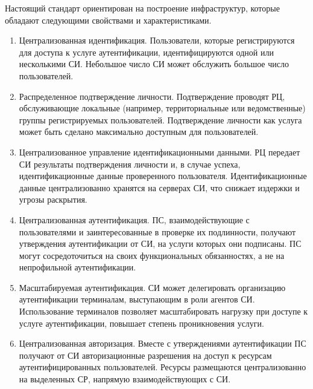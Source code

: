 Настоящий стандарт ориентирован на построение инфраструктур, которые обладают
следующими свойствами и характеристиками.

\begin{enumerate}
\item
Централизованная идентификация.
%
Пользователи, которые регистрируются для доступа к услуге аутентификации, 
идентифицируются одной или несколькими СИ. 
%
Небольшое число СИ может обслужить большое число пользователей.

\item
Распределенное подтверждение личности.
%
Подтверждение проводят РЦ, обслуживающие локальные (например, 
территориальные или ведомственные) группы регистрируемых пользователей. 
%
Подтверждение личности как услуга может быть сделано максимально доступным для 
пользователей.

\item
Централизованное управление идентификационными данными.
%
РЦ передает СИ результаты подтверждения личности и, в случае успеха, 
идентификационные данные проверенного пользователя.
%
Идентификационные данные централизованно хранятся на серверах СИ, что 
снижает издержки и угрозы раскрытия.

\item
Централизованная аутентификация.
%
ПС, взаимодействующие с пользователями и заинтересованные в проверке 
их подлинности, получают утверждения аутентификации от СИ, на услуги которых 
они подписаны.
%
ПС могут сосредоточиться на своих функциональных обязанностях, а не на 
непрофильной аутентификации.

\item
Масштабируемая аутентификация.
%
СИ может делегировать организацию аутентификации терминалам, выступающим в роли
агентов СИ. Использование терминалов позволяет масштабировать нагрузку при
доступе к услуге аутентификации, повышает степень проникновения услуги.

\item
Централизованная авторизация. 
%
Вместе с утверждениями аутентификации ПС получают от СИ авторизационные 
разрешения на доступ к ресурсам аутентифицированных пользователей. Ресурсы 
размещаются централизованно на выделенных СР, напрямую взаимодействующих с СИ.
\end{enumerate}

